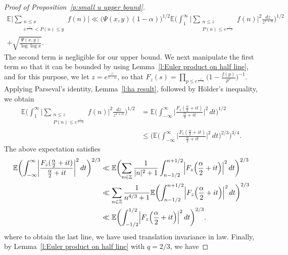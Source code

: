 \documentclass[12pt,a4paper,reqno]{amsart}
\numberwithin{equation}{section}
\def\Z{\mathbb Z}
\def\E{\mathbb E}
\def\leq {\leqslant}
\theoremstyle{remark}
\theoremstyle{definition}
\numberwithin{equation}{section}
\theoremstyle{remark}
\def\E{\mathbb E}
\begin{document}
\begin{proof}[Proof of Proposition~\ref{p:small u upper bound}]
\begin{equation}\label{equ:large y pre planch}
\begin{split}
\E \biggl| \sum_{\substack{n \leq x \\ e^{\frac{c}{1-\alpha}} < P(n) \leq y}} f(n) \biggr| \ll \bigl( \Psi (x,y) (1 - \alpha ) \bigr)^{1/2} \E \biggl( \int_{1}^{\infty} \biggl| \sum_{\substack{n \leq z \\ P(n) \leq e^{\frac{c}{1 - \alpha}}}} f(n) \biggr|^2 \frac{dz}{z^{1 + \alpha}} \biggr)^{1/2} \\ + \sqrt{\frac{\Psi(x,y)}{\log \log x}} .
\end{split}
\end{equation}
The second term is negligible for our upper bound. We next manipulate the first term so that it can be bounded by using Lemma~\ref{l:Euler product on half line}, and for this purpose, we let $z = e^{\frac{c}{1 - \alpha}}$, so that $F_{z} (s) = \prod_{p \leq e^{\frac{c}{1 - \alpha}}} \bigl( 1 - \frac{f(p)}{p^{s}} \bigr)^{-1}$. Applying Parseval's identity, Lemma~\ref{l:ha result}, followed by Hölder's inequality, we obtain
\begin{align*}
\E \biggl( \int_{1}^{\infty} \biggl| \sum_{\substack{n \leq z \\ P(n) \leq e^{\frac{c}{1 - \alpha}}}} f(n) \biggr|^2 \frac{dz}{z^{1 + \alpha}} \biggr)^{1/2} &= \E \biggl( \int_{-\infty}^{\infty} \biggl| \frac{F_{z} (\frac{\alpha}{2} + it)}{\frac{\alpha}{2} + it} \biggr|^2 \, dt \biggr)^{1/2} \\ 
&\leq \biggl( \E \biggl( \int_{-\infty}^{\infty} \biggl| \frac{F_{z} (\frac{\alpha}{2} + it)}{\frac{\alpha}{2} + it} \biggr|^2 \, dt \biggr)^{2/3} \biggr)^{3/4}.
\end{align*}
The above expectation satisfies 
\begin{align*}
\E \biggl( \int_{-\infty}^{\infty} \biggl| \frac{F_{z} (\frac{\alpha}{2} + it)}{\frac{\alpha}{2} + it} \biggr|^2 \, dt \biggr)^{2/3} & \ll \E \biggl( \sum_{n \in \Z} \frac{1}{|n|^{2} + 1} \int_{n - 1/2}^{n + 1/2} \Bigl| F_{z} \Bigl( \frac{\alpha}{2} + it \Bigr) \Bigr|^2 \, dt \biggr)^{2/3}  \\
& \ll \sum_{n \in \Z} \frac{1}{n^{4/3} + 1} \E \biggl( \int_{n - 1/2}^{n + 1/2} \Bigl| F_{z} \Bigl( \frac{\alpha}{2} + it \Bigr) \Bigr|^2 \, dt \biggr)^{2/3} \\
& \ll \E \biggl( \int_{-1/2}^{1/2} \Bigl| F_{z} \Bigl( \frac{\alpha}{2} + it \Bigr) \Bigr|^2 \, dt \biggr)^{2/3}.
\end{align*}
where to obtain the last line, we have used translation invariance in law. Finally, by Lemma~\ref{l:Euler product on half line} with $q = 2/3$, we have

\end{proof}
\end{document}
